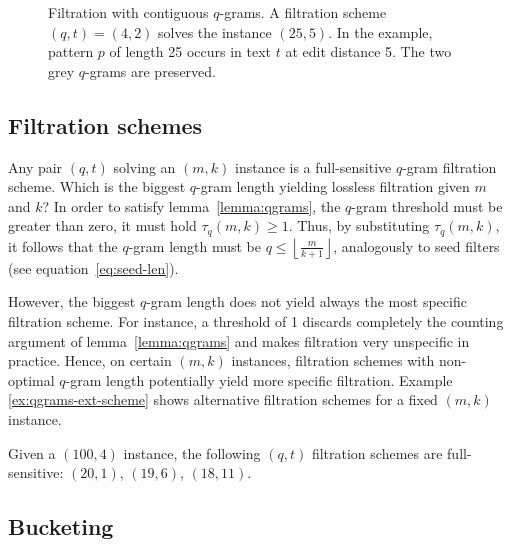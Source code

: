 \begin{figure}[h]
\begin{center}
\caption[Filtration with contiguous $q$-grams]{Filtration with contiguous $q$-grams. A filtration scheme $(q,t) = (4,2)$ solves the instance $(25,5)$. In the example, pattern $p$ of length 25 occurs in text $t$ at edit distance 5. The two grey $q$-grams are preserved.}
\label{fig:qgrams-ext}

\end{center}
\end{figure}

\subsection{Filtration schemes}

Any pair $(q,t)$ solving an $(m,k)$ instance is a full-sensitive $q$-gram filtration scheme.
Which is the biggest $q$-gram length yielding lossless filtration given $m$ and $k$?
In order to satisfy lemma~\ref{lemma:qgrams}, the $q$-gram threshold must be greater than zero, \ie it must hold $\tau_q(m,k) \geq 1$.
Thus, by substituting $\tau_q(m,k)$, it follows that the $q$-gram length must be $q \leq \left \lfloor \frac{m}{k+1} \right \rfloor$, analogously to seed filters (see equation~\ref{eq:seed-len}).

However, the biggest $q$-gram length does not yield always the most specific filtration scheme.
For instance, a threshold of 1 discards completely the counting argument of lemma~\ref{lemma:qgrams} and makes filtration very unspecific in practice.
Hence, on certain $(m,k)$ instances, filtration schemes with non-optimal $q$-gram length potentially yield more specific filtration.
Example \ref{ex:qgrams-ext-scheme} shows alternative filtration schemes for a fixed $(m,k)$ instance.

\begin{example}
\label{ex:qgrams-ext-scheme}
Given a $(100,4)$ instance, the following $(q,t)$ filtration schemes are full-sensitive:
$(20,1)$, $(19,6)$, $(18,11)$.
\end{example}

\subsection{Bucketing}

